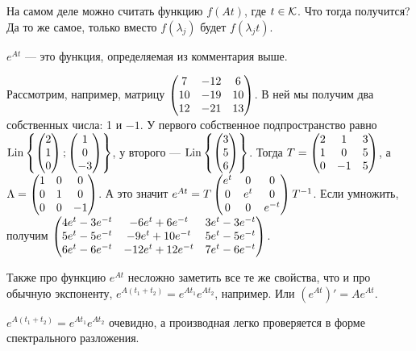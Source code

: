 \documentclass{article}
\begin{document}
\begin{itemize}
\begin{Proof}
        \end{Proof}
        \begin{Comment}
            На самом деле можно считать функцию $f(At)$, где $t\in{\mathcal{K}}$. Что тогда получится? Да то же самое, только вместо $f(\lambda_j)$ будет $f(\lambda_jt)$.
        \end{Comment}
        \dfn {} $e^{At}$ --- это функция, определяемая из комментария выше.
        \begin{Example}
            Рассмотрим, например, матрицу $\left(\begin{matrix}
                7 & -12 & 6\\
                10 & -19 & 10\\
                12 & -21 & 13
            \end{matrix}\right)$. В ней мы получим два собственных числа: 1 и $-1$. У первого собственное подпространство равно $\operatorname{Lin}\left\{\left(\begin{matrix}2\\1\\0\end{matrix}\right);\left(\begin{matrix}1\\0\\-3\end{matrix}\right)\right\}$, у второго --- $\operatorname{Lin}\left\{\left(\begin{matrix}3\\5\\6\end{matrix}\right)\right\}$. Тогда $T=\left(\begin{matrix}
                2 & 1 & 3\\
                1 & 0 & 5\\
                0 & -1 & 5
            \end{matrix}\right)$, а $\Lambda=\left(\begin{matrix}
                1 & 0 & 0\\
                0 & 1 & 0\\
                0 & 0 & -1
            \end{matrix}\right)$. А это значит $e^{At}=T\left(\begin{matrix}
                e^t & 0 & 0\\
                0 & e^t & 0\\
                0 & 0 & e^{-t}
            \end{matrix}\right)T^{-1}$. Если умножить, получим $\left(\begin{matrix}
                4e^t-3e^{-t} & -6e^t+6e^{-t} & 3e^t-3e^{-t}\\
                5e^t-5e^{-t} & -9e^t+10e^{-t} & 5e^t-5e^{-t}\\
                6e^t-6e^{-t} & -12e^t+12e^{-t} & 7e^t-6e^{-t}
            \end{matrix}\right)$. 
        \end{Example}
        \thm Также про функцию $e^{At}$ несложно заметить все те же свойства, что и про обычную экспоненту, $e^{A(t_1+t_2)}=e^{At_1}e^{At_2}$, например. Или $(e^{At})'=Ae^{At}$.
        \begin{Proof}
            $e^{A(t_1+t_2)}=e^{At_1}e^{At_2}$ очевидно, а производная легко проверяется в форме спектрального разложения.
        \end{Proof}

\end{itemize}
\end{document}
